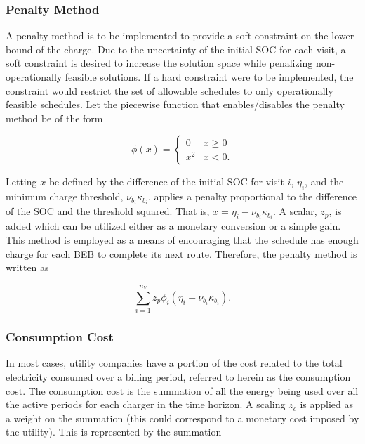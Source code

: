 \documentclass[energies,article,submit,moreauthors]{Definitions/mdpi}
\begin{document}
\subsubsection{Penalty Method}
\label{sec:sa-penalty-method}
A penalty method is to be implemented to provide a soft constraint on the lower bound of the charge. Due to the
uncertainty of the initial SOC for each visit, a soft constraint is desired to increase the solution space while
penalizing non-operationally feasible solutions. If a hard constraint were to be implemented, the constraint would
restrict the set of allowable schedules to only operationally feasible schedules. Let the piecewise function that
enables/disables the penalty method be of the form

\begin{equation}
\label{eq:penalty}
  \phi(x) =
  \begin{cases}
    0   & x \ge 0 \\
    x^2 & x < 0\text{.}
  \end{cases}
\end{equation}

Letting \(x\) be defined by the difference of the initial SOC for visit \(i\), \(\eta_i\), and the minimum charge threshold,
\(\nu_{b_i}\kappa_{b_i}\), applies a penalty proportional to the difference of the SOC and the threshold squared. That is, \(x =
\eta_i - \nu_{b_i} \kappa_{b_i}\). A scalar, \(z_p\), is added which can be utilized either as a monetary conversion or a simple
gain. This method is employed as a means of encouraging that the schedule has enough charge for each BEB to complete its
next route. Therefore, the penalty method is written as

\begin{equation}
\label{eq:penalty-method}
\sum_{i=1}^{n_V} z_p \phi_i(\eta_i - \nu_{b_i} \kappa_{b_i})\text{.}
\end{equation}

\subsubsection{Consumption Cost}
\label{sec:sa-consumpction-cost}
In most cases, utility companies have a portion of the cost related to the total electricity consumed over a billing
period, referred to herein as the consumption cost. The consumption cost is the summation of all the energy being used
over all the active periods for each charger in the time horizon. A scaling \(z_c\) is applied as a weight on the
summation (this could correspond to a monetary cost imposed by the utility). This is represented by the summation
\end{document}

